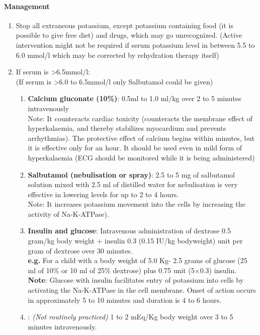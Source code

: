 \documentclass[11pt,a4paper]{report}
\begin{document}
\begin{enumerate}
	\paragraph{Management}
	\begin{enumerate}
		\item Stop all extraneous potassium, except potassium containing food (it is possible to give  free diet) and drugs, which may go unrecognized. (Active intervention might not be required if serum potassium level in between 5.5 to 6.0 mmol/l which may be corrected by rehydration therapy itself)
		\item If serum  is \textgreater6.5mmol/l: \\(If serum  is \textgreater6.0 to 6.5mmol/l only Salbutamol could be given)
		\begin{enumerate}
			\item \textbf{Calcium gluconate (10\%)}: 0.5ml to 1.0 ml/kg over 2 to 5 minutes intravenously\\
			Note: It counteracts cardiac toxicity (counteracts the membrane effect of hyperkalaemia, and thereby stabilizes myocardium and prevents arrhythmias). The protective effect of calcium begins within minutes, but it is effective only for an hour. It should be used even in mild form of hyperkalaemia (ECG should be monitored while it is being administered)
			\item \textbf{Salbutamol (nebulisation or spray)}: 2.5 to 5 mg of salbutamol solution mixed with 2.5 ml of distilled water for nebulisation is very effective in lowering  levels for up to 2 to 4 hours.\\
			Note: It increases potassium movement into the cells by increasing the  activity of Na-K-ATPase). 
			\item \textbf{Insulin and glucose}: Intravenous administration of dextrose 0.5 gram/kg body weight + insulin 0.3 (0.15 IU/kg bodyweight) unit per gram of dextrose over 30 minutes.\\ 
			\textbf{e.g.} For a child with a body weight of 5.0 Kg- 2.5 grams of glucose (25 ml of 10\% or 10 ml of 25\% dextrose) plus 0.75 unit (5$\times$0.3) insulin. \\ 
			\textbf{Note}: Glucose with insulin facilitates entry of potassium into cells by activating the Na-K-ATPase in the cell membrane. Onset of action occurs in approximately 5 to 10 minutes and duration is 4 to 6 hours.
			\item \textbf{}: {\color{red}\textit{(Not routinely practiced)}} 1 to 2 mEq/Kg body weight over 3 to 5 minutes intravenously.\\

\end{enumerate}
\end{enumerate}
\end{enumerate}
\end{document}
